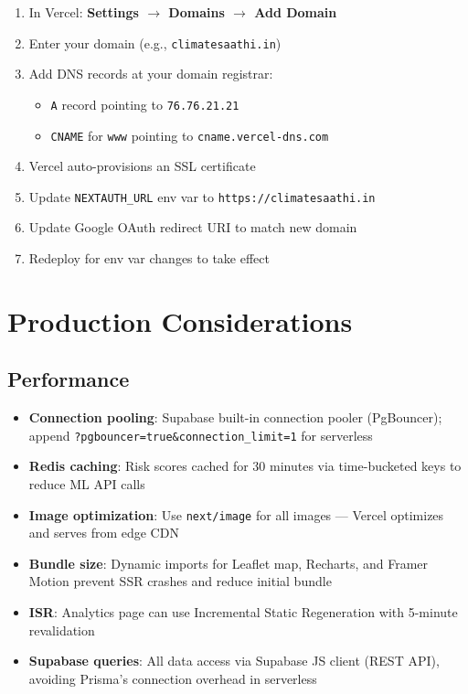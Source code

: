 \documentclass[12pt,a4paper]{report}
\begin{document}
\begin{enumerate}
  \item In Vercel: \textbf{Settings $\rightarrow$ Domains $\rightarrow$ Add Domain}
  \item Enter your domain (e.g., \texttt{climatesaathi.in})
  \item Add DNS records at your domain registrar:
  \begin{itemize}
    \item \texttt{A} record pointing to \texttt{76.76.21.21}
    \item \texttt{CNAME} for \texttt{www} pointing to \texttt{cname.vercel-dns.com}
  \end{itemize}
  \item Vercel auto-provisions an SSL certificate
  \item Update \texttt{NEXTAUTH\_URL} env var to \texttt{https://climatesaathi.in}
  \item Update Google OAuth redirect URI to match new domain
  \item Redeploy for env var changes to take effect
\end{enumerate}

\chapter{Production Considerations}

\section{Performance}

\begin{itemize}
  \item \textbf{Connection pooling}: Supabase built-in connection pooler (PgBouncer); append \texttt{?pgbouncer=true\&connection\_limit=1} for serverless
  \item \textbf{Redis caching}: Risk scores cached for 30 minutes via time-bucketed keys to reduce ML API calls
  \item \textbf{Image optimization}: Use \texttt{next/image} for all images --- Vercel optimizes and serves from edge CDN
  \item \textbf{Bundle size}: Dynamic imports for Leaflet map, Recharts, and Framer Motion prevent SSR crashes and reduce initial bundle
  \item \textbf{ISR}: Analytics page can use Incremental Static Regeneration with 5-minute revalidation
  \item \textbf{Supabase queries}: All data access via Supabase JS client (REST API), avoiding Prisma's connection overhead in serverless
\end{itemize}
\end{document}

